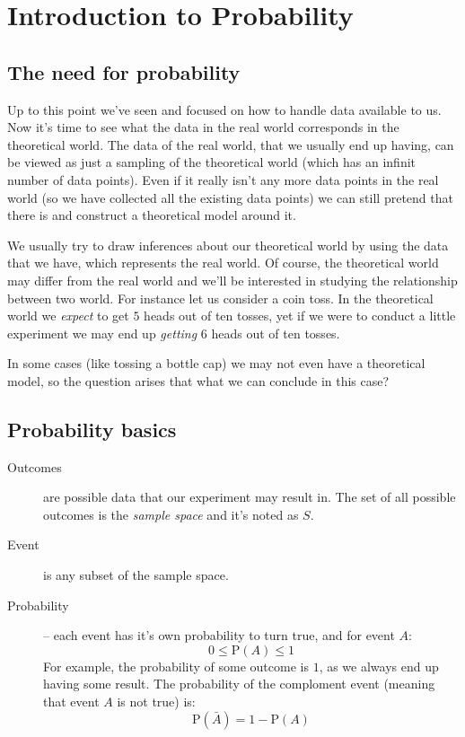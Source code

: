 \chapter*{Introduction to Probability}
\setcounter{section}{0}
\renewcommand*{\theHsection}{ch3.\the\value{section}}

\section{The need for probability}

Up to this point we've seen and focused on how to handle data available to us.
Now it's time to see what the data in the real world corresponds in the
theoretical world. The data of the real world, that we usually end up having,
can be viewed as just a sampling of the theoretical world (which has an
infinit number of data points). Even if it really isn't any more data points in
the real world (so we have collected all the existing data points) we can still
pretend that there is and construct a theoretical model around it.

We usually try to draw inferences about our theoretical world by using the data
that we have, which represents the real world. Of course, the theoretical world
may differ from the real world and we'll be interested in studying the
relationship between two world. For instance let us consider a coin toss. In the
theoretical world we \emph{expect} to get $5$ heads out of ten tosses, yet if we
were to conduct a little experiment we may end up \emph{getting} $6$ heads out
of ten tosses.

In some cases (like tossing a bottle cap) we may not even have a theoretical
model, so the question arises that what we can conclude in this case?

\section{Probability basics}

\begin{description}
	\item[Outcomes] are possible data that our experiment may result in. The set
	      of all possible outcomes is the \emph{sample space} and it's noted as $S$.
	\item[Event] is any subset of the sample space.
	\item[Probability] -- each event has it's own probability to turn true, and
	      for event $A$:
	      \[
		      0 \leq \mbox{P}(A) \leq 1
	      \]
	      For example, the probability of some outcome is $1$, as we always end up
	      having some result. The probability of the comploment event (meaning that
	      event $A$ is not true) is:
	      \[
		      \mbox{P}(\bar{A}) = 1 - \mbox{P}(A)
	      \]
\end{description}

